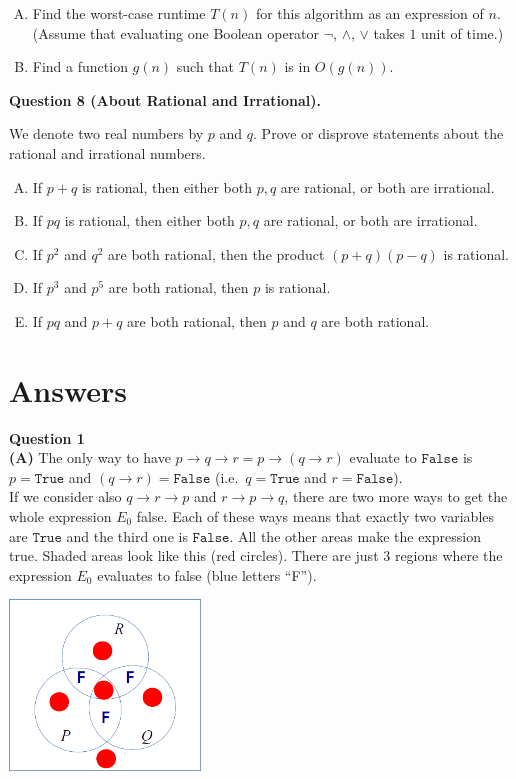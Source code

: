 \documentclass[jou]{apa6}
\begin{document}
\begin{enumerate}[(A)]
\item Find the worst-case runtime $T(n)$ for this algorithm as an expression of $n$.
(Assume that evaluating one Boolean operator $\neg$, $\wedge$, $\vee$ takes $1$ unit of time.)
\item Find a function $g(n)$ such that $T(n)$ is in $O(g(n))$. 
\end{enumerate}




\vspace{10pt}
{\bf Question 8 (About Rational and Irrational).}

We denote two real numbers by $p$ and $q$. 
Prove or disprove statements about the rational and irrational numbers. 

\begin{enumerate}[(A)]
\item If $p + q$ is rational, then either both $p,q$ are rational, or both are irrational. 
\item If $pq$ is rational, then either both $p,q$ are rational, or both are irrational. 
\item If $p^2$ and $q^2$ are both rational, then the product $(p+q)(p-q)$ is rational. 
\item If $p^3$ and $p^5$ are both rational, then $p$ is rational.
\item If $pq$ and $p+q$ are both rational, then $p$ and $q$ are both rational.
\end{enumerate}

\newpage

\section{Answers}


\vspace{6pt}
{\bf Question 1}\\
{\bf (A)} The only way to have $p \rightarrow q \rightarrow r = p \rightarrow (q \rightarrow r)$ evaluate to 
$\mathtt{False}$ is $p = \mathtt{True}$ and $(q \rightarrow r) = \mathtt{False}$ (i.e.\ 
$q = \mathtt{True}$ and $r = \mathtt{False}$).\\
If we consider also $q \rightarrow r \rightarrow p$ and $r \rightarrow p \rightarrow q$, there are two 
more ways to get the whole expression $E_0$ false. Each of these ways means that exactly two variables
are $\mathtt{True}$ and the third one is $\mathtt{False}$. 
All the other areas make the expression true. Shaded areas look like this (red circles). There are just $3$ 
regions where the expression $E_0$ evaluates to false (blue letters ``F''). 
\begin{center}
\includegraphics[width=2in]{midterm/circles-shaded.png}
\end{center}
\end{document}
